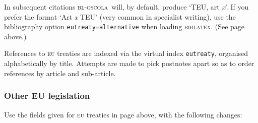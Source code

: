 \documentclass[a4paper,
               11pt,
	       DIV=1,			   
	       footinclude=false]
	      {scrartcl}
\newcommand{\oscola}{\textsc{bl-oscola}}
\newcommand{\biblatex}{\textsc{biblatex}}
\begin{document}
In subsequent citations \oscola\ will, by default, produce `TEU, art
\emph{x}'. If you prefer the format `Art \emph{x} TEU' (very common in
specialist writing), use the bibliography option
\texttt{eutreaty={}alternative} when loading \biblatex. (See page
\pageref{options} above.)

References to \textsc{eu} treaties are indexed via the virtual index
\texttt{eutreaty}, organised alphabetically by title. Attempts are
made to pick postnotes apart so as to order references by article and
sub-article.

\subsubsection{Other EU legislation}

Use the fields given for \textsc{eu} treaties in page
\pageref{eutreaties} above, with the following changes:
\end{document}
